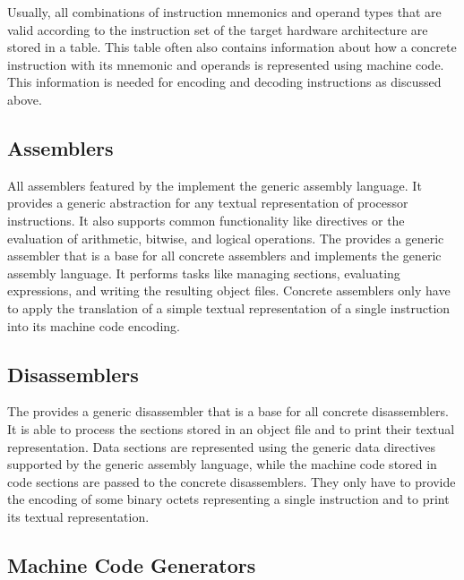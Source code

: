 Usually, all combinations of instruction mnemonics and operand types that are valid according to the instruction set of the target hardware architecture are stored in a table.
This table often also contains information about how a concrete instruction with its mnemonic and operands is represented using machine code.
This information is needed for encoding and decoding instructions as discussed above.

\subsection{Assemblers}\label{sec:extassemblers}

All assemblers featured by the \ecs{} implement the generic assembly language.
It provides a generic abstraction for any textual representation of processor instructions.
It also supports common functionality like directives or the evaluation of arithmetic, bitwise, and logical operations.
\seeassembly
The \ecs{} provides a generic assembler that is a base for all concrete assemblers and implements the generic assembly language.
It performs tasks like managing sections, evaluating expressions, and writing the resulting object files.
Concrete assemblers only have to apply the translation of a simple textual representation of a single instruction into its machine code encoding.

\subsection{Disassemblers}\label{sec:extdisassemblers}

The \ecs{} provides a generic disassembler that is a base for all concrete disassemblers.
It is able to process the sections stored in an object file and to print their textual representation.
Data sections are represented using the generic data directives supported by the generic assembly language,
while the machine code stored in code sections are passed to the concrete disassemblers.
They only have to provide the encoding of some binary octets representing a single instruction and to print its textual representation.

\subsection{Machine Code Generators}\label{sec:extgenerators}

